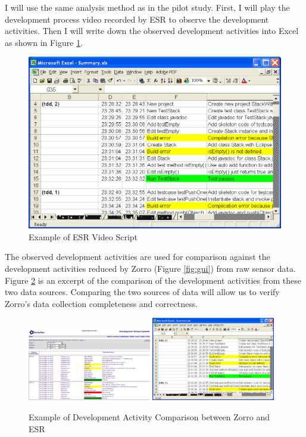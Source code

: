 I will use the same analysis method as in the pilot study. First, I
will play the development process video recorded by ESR to observe the
development activities. Then I will write down the observed
development activities into Excel as shown in Figure
\ref{fig:VideoExcel}.
\begin{figure}[htbp]
  \centering
  \includegraphics[width=1.0\textwidth]{figs/VideoScriptExcel.eps}
  \caption{Example of ESR Video Script}\label{fig:VideoExcel}
\end{figure}

The observed development activities are used for comparison against the
development activities reduced by Zorro (Figure \ref{fig:gui}) from
raw sensor data. Figure \ref{fig:DataVerification} is an excerpt of the
comparison of the development activities from these two data
sources. Comparing the two sources of data will allow us to verify
Zorro's data collection completeness and correctness.
\begin{figure}[hbtp]  
\centering
\includegraphics[width=0.48\textwidth]{figs/Zorro-Gui.eps} 
\includegraphics[width=0.48\textwidth]{figs/VideoScriptExcel.eps}
\caption{Example of Development Activity Comparison between Zorro and
ESR}
\label{fig:DataVerification}
\end{figure}

